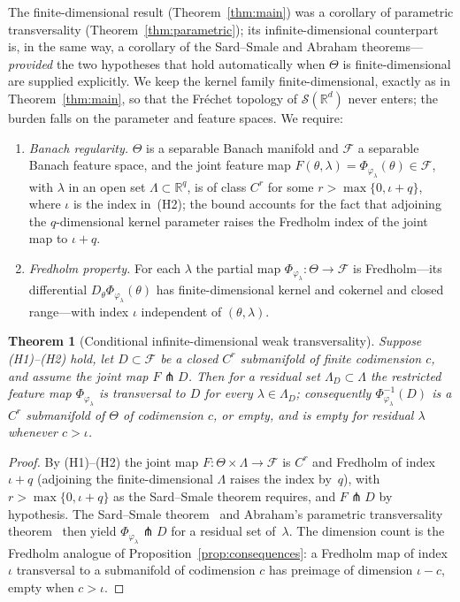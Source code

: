 \documentclass[11pt,a4paper]{article}
\newtheorem{theorem}{Theorem}[section]
\newcommand{\R}{\mathbb{R}}
\newcommand{\cS}{\mathcal{S}}
\begin{document}
The finite-dimensional result (Theorem~\ref{thm:main}) was a corollary of
parametric transversality (Theorem~\ref{thm:parametric}); its
infinite-dimensional counterpart is, in the same way, a corollary of the
Sard--Smale and Abraham theorems---\emph{provided} the two hypotheses that hold
automatically when $\Theta$ is finite-dimensional are supplied explicitly.  We
keep the kernel family finite-dimensional, exactly as in
Theorem~\ref{thm:main}, so that the Fr\'echet topology of $\cS(\R^d)$ never
enters; the burden falls on the parameter and feature spaces.  We require:
\begin{enumerate}[label=\textnormal{(H\arabic*)}]
\item \emph{Banach regularity.}  $\Theta$ is a separable Banach manifold and
$\mathcal F$ a separable Banach feature space, and the joint feature map
$F(\theta,\lambda)=\Phi_{\varphi_\lambda}(\theta)\in\mathcal F$, with $\lambda$
in an open set $\Lambda\subset\R^q$, is of class $C^r$ for some
$r>\max\{0,\iota+q\}$, where $\iota$ is the index in~(H2); the bound
accounts for the fact that adjoining the $q$-dimensional kernel
parameter raises the Fredholm index of the joint map to $\iota+q$.
\item \emph{Fredholm property.}  For each $\lambda$ the partial map
$\Phi_{\varphi_\lambda}:\Theta\to\mathcal F$ is Fredholm---its differential
$D_\theta\Phi_{\varphi_\lambda}(\theta)$ has finite-dimensional kernel and
cokernel and closed range---with index $\iota$ independent of
$(\theta,\lambda)$.
\end{enumerate}

\begin{theorem}[Conditional infinite-dimensional weak transversality]
\label{thm:infinite}
Suppose \textnormal{(H1)--(H2)} hold, let $D\subset\mathcal F$ be a closed
$C^r$ submanifold of finite codimension $c$, and assume the joint map
$F\pitchfork D$.  Then for a residual set $\Lambda_D\subset\Lambda$ the
restricted feature map $\Phi_{\varphi_\lambda}$ is transversal to $D$ for every
$\lambda\in\Lambda_D$; consequently $\Phi_{\varphi_\lambda}^{-1}(D)$ is a $C^r$
submanifold of $\Theta$ of codimension $c$, or empty, and is empty for residual
$\lambda$ whenever $c>\iota$.
\end{theorem}

\begin{proof}
By \textnormal{(H1)--(H2)} the joint map $F:\Theta\times\Lambda\to\mathcal F$ is
$C^r$ and Fredholm of index $\iota+q$ (adjoining the finite-dimensional
$\Lambda$ raises the index by~$q$), with $r>\max\{0,\iota+q\}$ as the
Sard--Smale theorem requires, and $F\pitchfork D$ by hypothesis.  The
Sard--Smale theorem~\cite{Smale1965} and Abraham's parametric transversality
theorem~\cite{Abraham1963} then yield $\Phi_{\varphi_\lambda}\pitchfork D$ for a
residual set of~$\lambda$.  The dimension count is the Fredholm analogue of
Proposition~\ref{prop:consequences}: a Fredholm map of index $\iota$
transversal to a submanifold of codimension $c$ has preimage of dimension
$\iota-c$, empty when $c>\iota$.
\end{proof}
\end{document}
